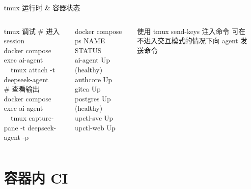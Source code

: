 \documentclass[10pt,aspectratio=169,utf8]{beamer}
\begin{document}
\begin{frame}[fragile]{tmux 运行时 \& 容器状态}
  \begin{columns}[T]
    \begin{block}{tmux 调试}
      \tiny
      \# 进入 session\\
      docker compose exec ai-agent \\
      \relax\ \ tmux attach -t deepseek-agent\\
      \# 查看输出\\
      docker compose exec ai-agent \\
      \relax\ \ tmux capture-pane -t deepseek-agent -p
    \end{block}

    \begin{block}{docker compose ps}
      \tiny
      NAME                  STATUS\\
      ai-agent   Up (healthy)\\
      authcore   Up\\
      gitea      Up\\
      postgres   Up (healthy)\\
      upctl-svc  Up\\
      upctl-web  Up
    \end{block}
    \begin{alertblock}{使用 tmux send-keys 注入命令}
      \tiny
      可在不进入交互模式的情况下向 agent 发送命令
    \end{alertblock}
  \end{columns}
\end{frame}

\section{容器内 CI}
\end{document}
